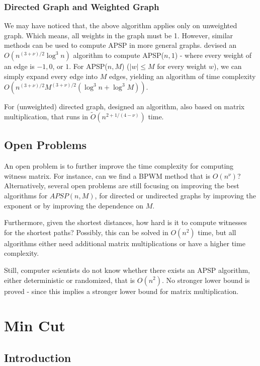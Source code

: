 \documentclass[12pt]{article}
\theoremstyle{plain}
\begin{document}
\subsubsection{Directed Graph and Weighted Graph}

We may have noticed that, the above algorithm applies only on unweighted graph. Which means, all weights in the graph must be 1. However, similar methods can be used to compute APSP in more general graphs. \cite{ALON1997255} devised an $O(n^{(3+\nu)/2}\log^3 n)$ algorithm to compute APSP($n,1$) - where every weight of an edge is $-1,0$, or $1$. For APSP($n,M$) ($|w|\le M$ for every weight $w$), we can simply expand every edge into $M$ edges, yielding an algorithm of time complexity $O(n^{(3+\nu)/2}M^{(3+\nu)/2}(\log^3 n+\log^3 M)).$

For (unweighted) directed graph, \cite{zwick2000pairsshortestpathsusing} designed an algorithm, also based on matrix multiplication, that runs in $\tilde O(n^{2+1/(4-\nu)})$ time.

\subsection{Open Problems}
An open problem is to further improve the time complexity for computing witness matrix. For instance, can we find a BPWM method that is $O(n^\nu)$? Alternatively, several open problems are still focusing on improving the best algorithms for $APSP(n, M)$, for directed or undirected graphs by improving the exponent or by improving the dependence on $M$.

Furthermore, given the shortest distances, how hard is it to compute witnesses for the shortest paths? Possibly, this can be solved in $O(n^2)$ time, but all algorithms either need additional matrix multiplications or have a higher time complexity.

Still, computer scientists do not know whether there exists an APSP algorithm, either deterministic or randomized, that is $O(n^2)$. No stronger lower bound is proved - since this implies a stronger lower bound for matrix multiplication.
\section{Min Cut}

\subsection{Introduction}\
\end{document}
